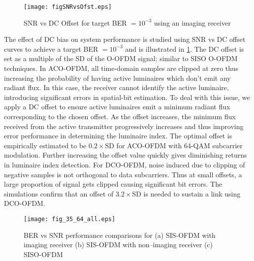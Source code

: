 \begin{figure}[!t]
\centering
		\texttt{[image: figSNRvsOfst.eps]}
\caption[SNR vs DC Offset for SIS-OFDM]{SNR vs DC Offset for target BER $= 10^{-3}$ using an imaging receiver}
	\label{fig:SNRvsOfst}
\end{figure}

The effect of DC bias on system performance is studied using SNR vs DC offset curves to achieve a target BER $=10^{-3}$ and is illustrated in \figurename{ \ref{fig:SNRvsOfst}}. The DC offset is set as a multiple of the SD of the O-OFDM signal; similar to SISO O-OFDM techniques. In ACO-OFDM, all time-domain samples are clipped at zero thus increasing the probability of having active luminaires which don't emit any radiant flux. In this case, the receiver cannot identify the active luminaire, introducing significant errors in spatial-bit estimation. To deal with this issue, we apply a DC offset to ensure active luminaires emit a minimum radiant flux corresponding to the chosen offset. As the offset increases, the minimum flux received from the active transmitter progressively increases and thus improving error performance in determining the luminaire index. The optimal offset is empirically estimated to be $0.2\times$SD for ACO-OFDM with 64-QAM subcarrier modulation. Further increasing the offset value quickly gives diminishing returns in luminaire index detection. For DCO-OFDM, noise induced due to clipping of negative samples is not orthogonal to data subcarriers. Thus at small offsets, a large proportion of signal gets clipped causing significant bit errors. The simulations confirm that an offset of $3.2\times$SD is needed to sustain a link using DCO-OFDM.

\begin{figure}[!t]
\centering
\texttt{[image: fig\_35\_64\_all.eps]}
\caption[SIS-OFDM and SISO-OFDM performance comparisons]{BER vs SNR performance comparisons for (a) SIS-OFDM with imaging receiver (b) SIS-OFDM with non--imaging receiver (c) SISO-OFDM}
	\label{fig:BERnet}
\end{figure}

